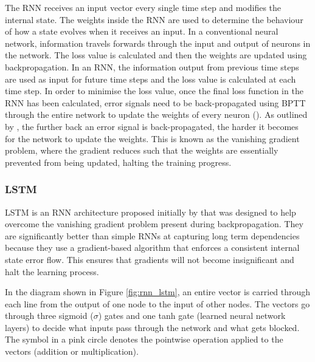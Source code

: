 The \acrshort{RNN} receives an input vector every single time step and modifies the internal state. The weights inside the \acrshort{RNN} are used to determine the behaviour of how a state evolves when it receives an input. 
In a conventional neural network, information travels forwards through the input and output of neurons in the network. The loss value is calculated and then the weights are updated using backpropagation.
In an \acrshort{RNN}, the information output from previous time steps are used as input for future time steps and the loss value is calculated at each time step. In order to minimise the loss value, once the final loss function in the \acrshort{RNN} has been calculated, error signals need to be back-propagated using \acrfull{BPTT} through the entire network to update the weights of every neuron (\cite{salehinejad_recent_rnn_2018}).
As outlined by \cite{bengio_learning_1994}, the further back an error signal is back-propagated, the harder it becomes for the network to update the weights. This is known as the vanishing gradient problem, where the gradient reduces such that the weights are essentially prevented from being updated, halting the training progress.

\subsubsection{\acrlong{LSTM}}

\acrfull{LSTM} is an \acrshort{RNN} architecture proposed initially by \cite{hochreiter_long_1997} that was designed to help overcome the vanishing gradient problem present during backpropagation. They are significantly better than simple \acrshort{RNN}s at capturing long term dependencies because they use a gradient-based algorithm that enforces a consistent internal state error flow. This ensures that gradients will not become insignificant and halt the learning process.

In the diagram shown in Figure \ref{fig:rnn_lstm}, an entire vector is carried through each line from the output of one node to the input of other nodes. The vectors go through three sigmoid ($\sigma$) gates and one tanh gate (learned neural network layers) to decide what inputs pass through the network and what gets blocked. The symbol in a pink circle denotes the pointwise operation applied to the vectors (addition or multiplication).

